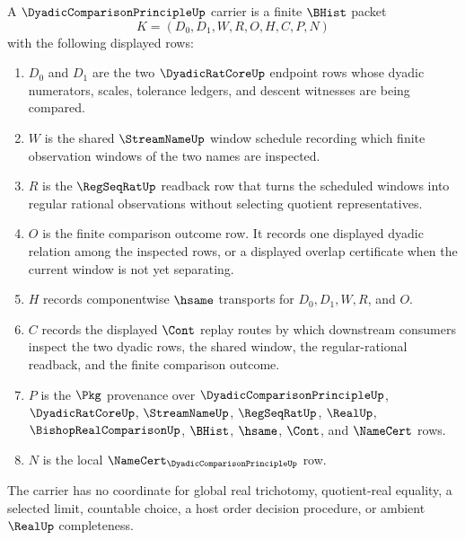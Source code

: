 \begin{definition}
\label{def:dyadic-comparison-principle-carrier}
A $\DyadicComparisonPrincipleUp$ carrier is a finite $\BHist$ packet
$$
K=(D_0,D_1,W,R,O,H,C,P,N)
$$
with the following displayed rows:
\begin{enumerate}
\item $D_0$ and $D_1$ are the two $\DyadicRatCoreUp$ endpoint rows whose dyadic numerators, scales, tolerance ledgers, and descent witnesses are being compared.
\item $W$ is the shared $\StreamNameUp$ window schedule recording which finite observation windows of the two names are inspected.
\item $R$ is the $\RegSeqRatUp$ readback row that turns the scheduled windows into regular rational observations without selecting quotient representatives.
\item $O$ is the finite comparison outcome row. It records one displayed dyadic relation among the inspected rows, or a displayed overlap certificate when the current window is not yet separating.
\item $H$ records componentwise $\hsame$ transports for $D_0,D_1,W,R$, and $O$.
\item $C$ records the displayed $\Cont$ replay routes by which downstream consumers inspect the two dyadic rows, the shared window, the regular-rational readback, and the finite comparison outcome.
\item $P$ is the $\Pkg$ provenance over $\DyadicComparisonPrincipleUp$, $\DyadicRatCoreUp$, $\StreamNameUp$, $\RegSeqRatUp$, $\RealUp$, $\BishopRealComparisonUp$, $\BHist$, $\hsame$, $\Cont$, and $\NameCert$ rows.
\item $N$ is the local $\NameCert_{\DyadicComparisonPrincipleUp}$ row.
\end{enumerate}
The carrier has no coordinate for global real trichotomy, quotient-real equality, a selected limit, countable choice, a host order decision procedure, or ambient $\RealUp$ completeness.
\end{definition}


